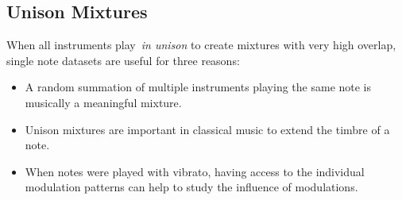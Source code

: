 \subsection{Unison Mixtures}
\label{sec:scenario}


When all instruments play~\emph{in unison} to create mixtures with very high overlap, single note datasets are useful for three reasons:

\begin{itemize}
  \item A random summation of multiple instruments playing the same note is musically a meaningful mixture.
  \item Unison mixtures are important in classical music to extend the timbre of a note.
  \item When notes were played with vibrato, having access to the individual modulation patterns can help to study the influence of modulations.
\end{itemize}




